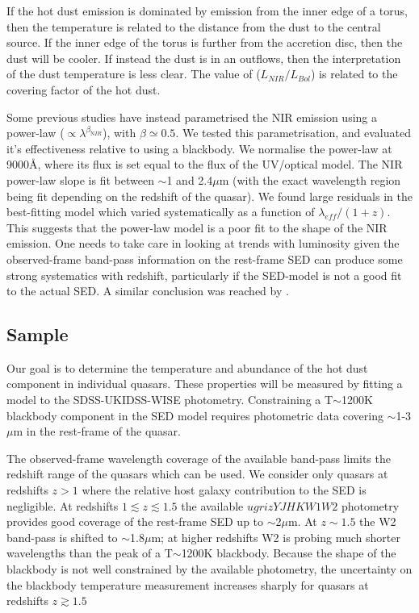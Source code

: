 If the hot dust emission is dominated by emission from the inner edge of a torus, then the temperature is related to the distance from the dust to the central source. 
If the inner edge of the torus is further from the accretion disc, then the dust will be cooler.
If instead the dust is in an outflows, then the interpretation of the dust temperature is less clear.  
The value of ($L_{NIR}/L_{Bol}$) is related to the covering factor of the hot dust. 

Some previous studies \citep[e.g.][]{wang13,zhang14} have instead parametrised the NIR emission using a power-law ($\propto \lambda^{\beta_{\mathrm NIR}}$), with $\beta \simeq 0.5$. 
We tested this parametrisation, and evaluated it's effectiveness relative to using a blackbody. 
We normalise the power-law at 9000\AA, where its flux is set equal to the flux of the UV/optical model. 
The NIR power-law slope is fit between $\sim$1 and 2.4$\mu$m (with the exact wavelength region being fit depending on the redshift of the quasar). 
We found large residuals in the best-fitting model which varied systematically as a function of $\lambda_{eff}/(1+z)$.  
This suggests that the power-law model is a poor fit to the shape of the NIR emission. 
One needs to take care in looking at trends with luminosity given the observed-frame band-pass information on the rest-frame SED can produce some strong systematics with redshift, particularly if the SED-model is not a good fit to the actual SED. 
A similar conclusion was reached by \citet{gallagher07}.

\subsection{Sample}

Our goal is to determine the temperature and abundance of the hot dust component in individual quasars.  
These properties will be measured by fitting a model to the SDSS-UKIDSS-WISE photometry. 
Constraining a T$\sim$1200K blackbody component in the SED model requires photometric data covering $\sim$1-3$\mu$m in the rest-frame of the quasar. 

The observed-frame wavelength coverage of the available band-pass limits the redshift range of the quasars which can be used. 
We consider only quasars at redshifts $z>1$ where the relative host galaxy contribution to the SED is negligible. 
At redshifts $1 \lesssim z \lesssim 1.5$ the available $ugrizYJHKW1W2$ photometry provides good coverage of the rest-frame SED up to $\sim$2$\mu$m.
At $z\sim1.5$ the W2 band-pass is shifted to $\sim$1.8$\mu$m; at higher redshifts W2 is probing much shorter wavelengths than the peak of a T$\sim$1200K blackbody. 
Because the shape of the blackbody is not well constrained by the available photometry, the uncertainty on the blackbody temperature measurement increases sharply for quasars at redshifts $z\gtrsim1.5$ 

